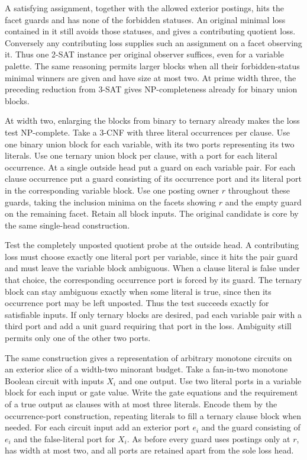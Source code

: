 A satisfying assignment, together with the allowed
exterior postings, hits the facet guards and has
none of the forbidden statuses. An original minimal
loss contained in it still avoids those statuses,
and gives a contributing quotient loss. Conversely
any contributing loss supplies such an assignment
on a facet observing it. Thus one 2-SAT instance per
original observer suffices, even for a variable
palette. The same reasoning permits larger blocks
when all their forbidden-status minimal winners
are given and have size at most two. At prime width
three, the preceding reduction from 3-SAT gives
NP-completeness already for binary union blocks.

At width two, enlarging the blocks from binary to
ternary already makes the loss test NP-complete.
Take a 3-CNF with three literal occurrences per
clause. Use one binary union block for each variable,
with its two ports representing its two literals.
Use one ternary union block per clause, with a port
for each literal occurrence. At a single outside
head put a guard on each variable pair. For each
clause occurrence put a guard consisting of its
occurrence port and its literal port in the
corresponding variable block. Use one posting
owner $r$ throughout these guards, taking the
inclusion minima on the facets showing $r$ and
the empty guard on the remaining facet. Retain
all block inputs. The original candidate is core
by the same single-head construction.

Test the completely unposted quotient probe at the
outside head. A contributing loss must choose
exactly one literal port per variable, since it
hits the pair guard and must leave the variable
block ambiguous. When a clause literal is false
under that choice, the corresponding occurrence
port is forced by its guard. The ternary block
can stay ambiguous exactly when some literal is
true, since then its occurrence port may be left
unposted. Thus the test succeeds exactly for
satisfiable inputs. If only ternary blocks are
desired, pad each variable pair with a third
port and add a unit guard requiring that port
in the loss. Ambiguity still permits only one
of the other two ports.

The same construction gives a representation of
arbitrary monotone circuits on an exterior slice
of a width-two minorant budget. Take a fan-in-two
monotone Boolean circuit with inputs $X_i$ and
one output. Use two literal ports in a variable
block for each input or gate value. Write the
gate equations and the requirement of a true
output as clauses with at most three literals.
Encode them by the occurrence-port construction,
repeating literals to fill a ternary clause
block when needed. For each circuit input add an
exterior port $e_i$ and the guard consisting of
$e_i$ and the false-literal port for $X_i$. As
before every guard uses postings only at $r$,
has width at most two, and all ports are retained
apart from the sole loss head.

